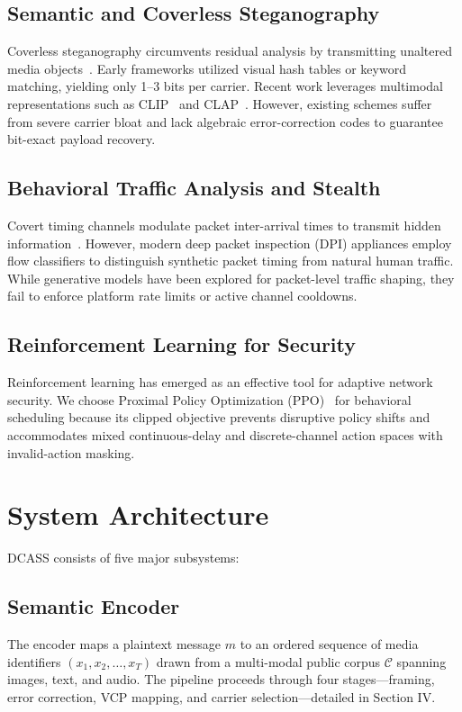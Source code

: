\documentclass[conference]{IEEEtran}
\begin{document}
\subsection{Semantic and Coverless Steganography}

Coverless steganography circumvents residual analysis by transmitting unaltered media objects~\cite{zhou2019coverless}. Early frameworks utilized visual hash tables or keyword matching, yielding only 1--3 bits per carrier. Recent work leverages multimodal representations such as CLIP~\cite{radford2021learning} and CLAP~\cite{elizalde2023clap}. However, existing schemes suffer from severe carrier bloat and lack algebraic error-correction codes to guarantee bit-exact payload recovery.

\subsection{Behavioral Traffic Analysis and Stealth}

Covert timing channels modulate packet inter-arrival times to transmit hidden information~\cite{cabuk2004ip}. However, modern deep packet inspection (DPI) appliances employ flow classifiers to distinguish synthetic packet timing from natural human traffic. While generative models have been explored for packet-level traffic shaping, they fail to enforce platform rate limits or active channel cooldowns.

\subsection{Reinforcement Learning for Security}

Reinforcement learning has emerged as an effective tool for adaptive network security. We choose Proximal Policy Optimization (PPO)~\cite{schulman2017proximal} for behavioral scheduling because its clipped objective prevents disruptive policy shifts and accommodates mixed continuous-delay and discrete-channel action spaces with invalid-action masking.

\section{System Architecture}

DCASS consists of five major subsystems:

\subsection{Semantic Encoder}
The encoder maps a plaintext message $m$ to an ordered sequence of media identifiers $(x_1, x_2, \dots, x_T)$ drawn from a multi-modal public corpus $\mathcal{C}$ spanning images, text, and audio. The pipeline proceeds through four stages---framing, error correction, VCP mapping, and carrier selection---detailed in Section IV.
\end{document}
